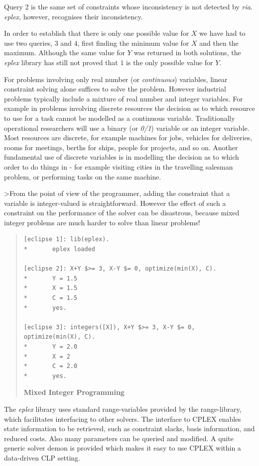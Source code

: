 \documentclass[a4wide]{article}
\begin{document}
Query 2 is the same set of constraints whose inconsistency is not
detected by {\em ria}.
{\em eplex}, however, recognises their inconsistency.

In order to establish that there is only one possible value for $X$ we
have had to use two queries, 3 and 4, first finding the minimum value
for $X$ and then the maximum.
Although the same value for $Y$ was returned in both solutions, the
{\em eplex} library has still not proved that $1$ is the only
possible value for $Y$.

For problems involving only real number (or {\em continuous}) variables,
linear constraint solving alone suffices to solve the problem.
However industrial problems typically include a mixture of real number
and integer variables.
For example in problems involving discrete resources the
decision as to 
which resource to use for a task cannot be modelled as a continuous
variable. 
Traditionally operational researchers will use a binary (or {\em 0/1})
variable or an integer variable.
Most resources are discrete, for example machines for jobs, vehicles
for deliveries, rooms for meetings, berths for ships, people for
projects, and so on.
Another fundamental use of discrete variables is in modelling the
decision as to which order to do things in - for example visiting
cities in the travelling salesman problem, or performing tasks on the
same machine.

>From the point of view of the programmer, adding the constraint that a
variable is integer-valued is straightforward.
However the effect of such a constraint on the performance of the
solver can be disastrous, because mixed integer problems are much
harder to solve than linear problems!
\begin{quote}
\begin{verbatim}
[eclipse 1]: lib(eplex).
*       eplex loaded

[eclipse 2]: X+Y $>= 3, X-Y $= 0, optimize(min(X), C).
*       Y = 1.5
*       X = 1.5
*       C = 1.5
*       yes.

[eclipse 3]: integers([X]), X+Y $>= 3, X-Y $= 0, optimize(min(X), C).
*       Y = 2.0
*       X = 2
*       C = 2.0
*       yes.

\end{verbatim}
{\bf Mixed Integer Programming}
\label{mixint}
\end{quote}


The  {\em eplex} library uses standard range-variables provided by the
range-library, 
which facilitates interfacing to other solvers. The interface to CPLEX
enables 
state information to be retrieved,  such as constraint slacks, basis
information,  and reduced costs. 
Also many parameters can be queried and modified.
A quite generic solver demon is provided which makes it easy to use
CPLEX   
within a data-driven CLP setting. 
\end{document}
